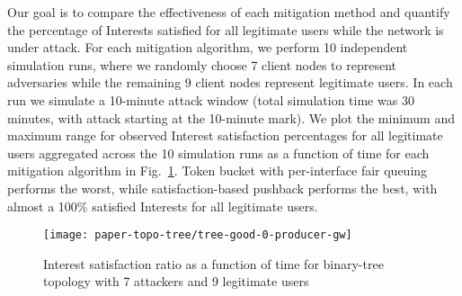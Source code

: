
Our goal is to compare the effectiveness of each mitigation method and quantify the percentage of Interests satisfied for all legitimate users while the network is under attack. For each mitigation algorithm, we perform 10 independent simulation runs, where we randomly choose 7 client nodes to represent adversaries while the remaining 9 client nodes represent legitimate users. In each run we simulate a 10-minute attack window (total simulation time was 30 minutes, with attack starting at the 10-minute mark). We plot the minimum and maximum range for observed Interest satisfaction percentages for all legitimate users aggregated across the 10 simulation runs as a function of time for each mitigation algorithm in Fig.~\ref{fig:small-scale attack progress}. Token bucket with per-interface fair queuing performs the worst, while satisfaction-based pushback performs the best, with almost a 100\%  satisfied Interests for all legitimate users.


\begin{figure}[]
  \centering
  \hspace{-0.8cm}\texttt{[image: paper-topo-tree/tree-good-0-producer-gw]}
  \vspace{-.3cm}
  \caption{Interest satisfaction ratio as a function of time for binary-tree topology with 7 attackers and 9 legitimate users}
  \label{fig:small-scale attack progress}
  \vspace{-.4cm}
\end{figure}



